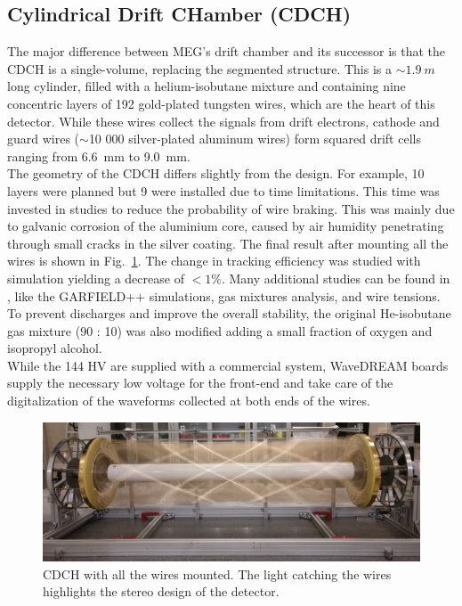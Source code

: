 \begin{refsection}
    \subsection{Cylindrical Drift CHamber (CDCH)}
        The major difference between MEG's drift chamber and its successor is that the CDCH is a single-volume, replacing the segmented structure.
        This is a $\sim\SI{1.9}{m}$ long cylinder, filled with a helium-isobutane mixture and containing nine concentric layers of 192 gold-plated tungsten wires, which are the heart of this detector.
        While these wires collect the signals from drift electrons, cathode and guard wires ($\sim$10 000 silver-plated aluminum wires) form squared drift cells ranging from \SI{6.6}{mm} to \SI{9.0}{mm}.\\
        The geometry of the CDCH differs slightly from the design.
        For example, 10 layers were planned but 9 were installed due to time limitations. This time was invested in studies to reduce the probability of wire braking.
        This was mainly due to galvanic corrosion of the aluminium core, caused by air humidity penetrating through small cracks in the silver coating.
        The final result after mounting all the wires is shown in Fig.~\ref{fig:MEGII:CDCH}.
        The change in tracking efficiency was studied with simulation yielding a decrease of $< 1\%$.
        Many additional studies can be found in \cite{MEG_II:detector}, like the GARFIELD++ simulations, gas mixtures analysis, and wire tensions.
        To prevent discharges and improve the overall stability, the original He-isobutane gas mixture (90 : 10) was also modified adding a small fraction of oxygen and isopropyl alcohol.\\
        While the 144 HV are supplied with a commercial system, WaveDREAM boards supply the necessary low voltage for the front-end and take care of the digitalization of the waveforms collected at both ends of the wires.

        \begin{figure}
            \centering
            \includegraphics[width = \textwidth]{Figures/MEG/CDCH.png}
            \caption{CDCH with all the wires mounted. The light catching the wires highlights the stereo design of the detector.}
            \label{fig:MEGII:CDCH}
        \end{figure}


\end{refsection}
